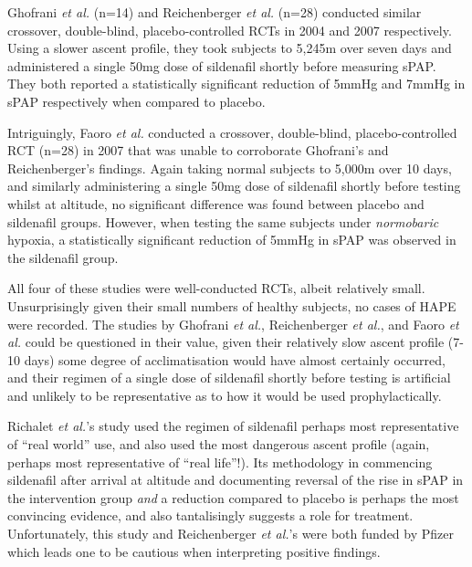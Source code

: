\documentclass[12pt,a4paper]{article}
\begin{document}
Ghofrani \emph{et al.}\cite{Ghofrani:2004gp} (n=14) and Reichenberger \emph{et al.}\cite{Reichenberger:2007bw} (n=28) conducted similar crossover, double-blind, placebo-controlled RCTs in 2004 and 2007 respectively. Using a slower ascent profile, they took subjects to 5,245m over seven days and administered a single 50mg dose of sildenafil shortly before measuring sPAP. They both reported a statistically significant reduction of 5mmHg and 7mmHg in sPAP respectively when compared to placebo.

Intriguingly, Faoro \emph{et al.} conducted a crossover, double-blind, placebo-controlled RCT (n=28) in 2007 that was unable to corroborate Ghofrani's and Reichenberger's findings. Again taking normal subjects to 5,000m over 10 days, and similarly administering a single 50mg dose of sildenafil shortly before testing whilst at altitude, no significant difference was found between placebo and sildenafil groups.\cite{Faoro:2007ji} However, when testing the same subjects under \emph{normobaric} hypoxia, a statistically significant reduction of 5mmHg in sPAP was observed in the sildenafil group.\cite{Faoro:2007ji}

All four of these studies were well-conducted RCTs, albeit relatively small. Unsurprisingly given their small numbers of healthy subjects, no cases of HAPE were recorded. The studies by Ghofrani \emph{et al.},\cite{Ghofrani:2004gp} Reichenberger \emph{et al.},\cite{Reichenberger:2007bw} and Faoro \emph{et al.}\cite{Faoro:2007ji} could be questioned in their value, given their relatively slow ascent profile (7-10 days) some degree of acclimatisation would have almost certainly occurred, and their regimen of a single dose of sildenafil shortly before testing is artificial and unlikely to be representative as to how it would be used prophylactically.

Richalet \emph{et al.}'s study\cite{Richalet:2005el} used the regimen of sildenafil perhaps most representative of ``real world'' use, and also used the most dangerous ascent profile (again, perhaps most representative of ``real life''!). Its methodology in commencing sildenafil after arrival at altitude and documenting reversal of the rise in sPAP in the intervention group \emph{and} a reduction compared to placebo is perhaps the most convincing evidence, and also tantalisingly suggests a role for treatment. Unfortunately, this study and Reichenberger \emph{et al.}'s\cite{Reichenberger:2007bw} were both funded by Pfizer which leads one to be cautious when interpreting positive findings.
\end{document}
